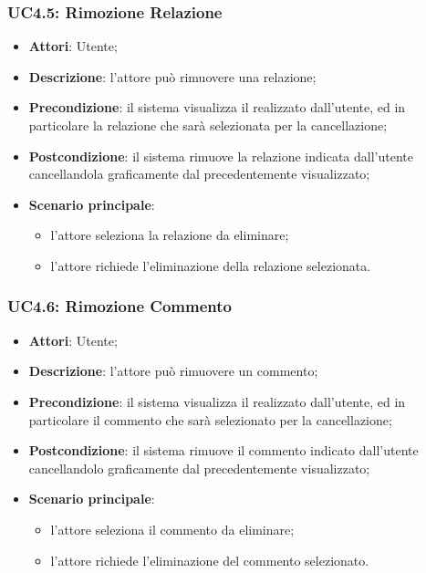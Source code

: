 \subsubsection{UC4.5: Rimozione Relazione}
\label{UC4.5}
\begin{itemize}
	\item \textbf{Attori}: Utente;
	\item \textbf{Descrizione}: l'attore può rimuovere una relazione;
	\item \textbf{Precondizione}: il sistema visualizza il  realizzato dall'utente, ed in particolare la relazione che sarà selezionata per la cancellazione;
	\item \textbf{Postcondizione}: il sistema rimuove la relazione indicata dall'utente cancellandola graficamente dal  precedentemente visualizzato;
	\item \textbf{Scenario principale}:
	\begin{itemize}
		\item l'attore seleziona la relazione da eliminare;
		\item l'attore richiede l'eliminazione della relazione selezionata.
	\end{itemize}
\end{itemize}

\subsubsection{UC4.6: Rimozione Commento}
\label{UC4.6}
\begin{itemize}
	\item \textbf{Attori}: Utente;
	\item \textbf{Descrizione}: l'attore può rimuovere un commento;
	\item \textbf{Precondizione}: il sistema visualizza il  realizzato dall'utente, ed in particolare il commento che sarà selezionato per la cancellazione;
	\item \textbf{Postcondizione}: il sistema rimuove il commento indicato dall'utente cancellandolo graficamente dal  precedentemente visualizzato;
	\item \textbf{Scenario principale}:
	\begin{itemize}
		\item l'attore seleziona il commento da eliminare;
		\item l'attore richiede l'eliminazione del commento selezionato.
	\end{itemize}
\end{itemize}

